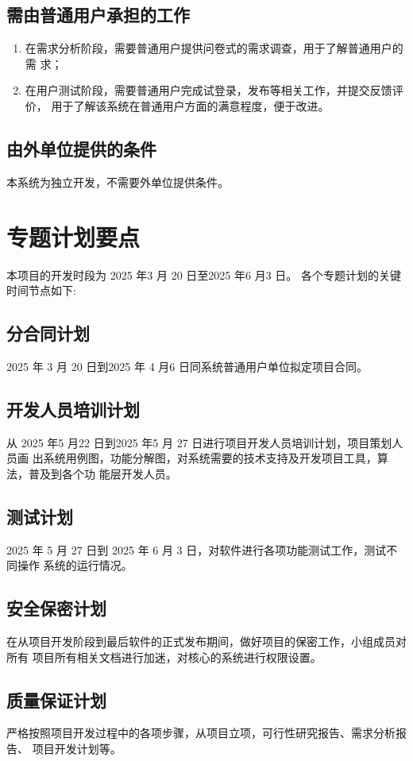 \documentclass[
    report,     %
    oneside,    %
    UTF8,       %
    zihao=-4    %
]{config} %
\begin{document}
\subsection{需由普通用户承担的工作}
\begin{enumerate}[label=(\arabic*)]
\item 在需求分析阶段，需要普通用户提供问卷式的需求调查，用于了解普通用户的需
求；
\item 在用户测试阶段，需要普通用户完成试登录，发布等相关工作，并提交反馈评价，
用于了解该系统在普通用户方面的满意程度，便于改进。
\end{enumerate}
\subsection{由外单位提供的条件}
本系统为独立开发，不需要外单位提供条件。
\section{专题计划要点}
本项目的开发时段为 2025 年3 月 20 日至2025 年6 月3 日。
各个专题计划的关键时间节点如下:
\subsection{分合同计划}
2025 年 3 月 20 日到2025 年 4 月6 日同系统普通用户单位拟定项目合同。
\subsection{开发人员培训计划}
从 2025 年5 月22 日到2025 年5 月 27 日进行项目开发人员培训计划，项目策划人员画
出系统用例图，功能分解图，对系统需要的技术支持及开发项目工具，算法，普及到各个功
能层开发人员。
\subsection{测试计划}
2025 年 5 月 27 日到 2025 年 6 月 3 日，对软件进行各项功能测试工作，测试不同操作
系统的运行情况。
\subsection{安全保密计划}
在从项目开发阶段到最后软件的正式发布期间，做好项目的保密工作，小组成员对所有
项目所有相关文档进行加迷，对核心的系统进行权限设置。
\subsection{质量保证计划}
严格按照项目开发过程中的各项步骤，从项目立项，可行性研究报告、需求分析报告、
项目开发计划等。
\end{document}
